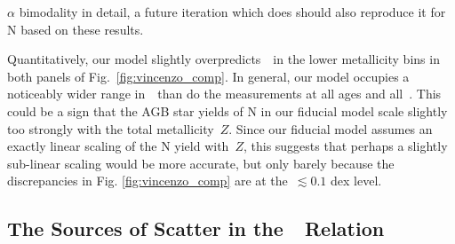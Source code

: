 \documentclass[ms.tex]{subfiles}
\begin{document}
$\alpha$ bimodality in detail, a future iteration which does should also
reproduce it for N based on these results.
\par
Quantitatively, our model slightly overpredicts~\no~in the lower metallicity
bins in both panels of Fig.~\ref{fig:vincenzo_comp}.
In general, our model occupies a noticeably wider range in~\no~than do the
\citet{Vincenzo2021} measurements at all ages and all~\ofe.
This could be a sign that the AGB star yields of N in our fiducial model scale
slightly too strongly with the total metallicity~$Z$.
Since our fiducial model assumes an exactly linear scaling of the N yield
with~$Z$, this suggests that perhaps a slightly sub-linear scaling would be
more accurate, but only barely because the discrepancies in Fig.
\ref{fig:vincenzo_comp} are at the~$\lesssim 0.1$ dex level.

\subsection{The Sources of Scatter in the~\ohno~Relation}
\label{sec:results:schaefer_comp}
\end{document}

